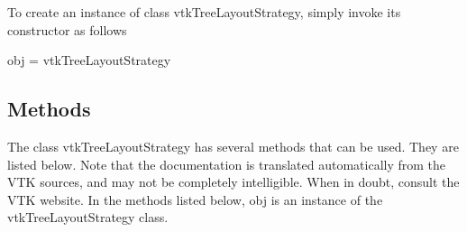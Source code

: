 To create an instance of class vtk\-Tree\-Layout\-Strategy, simply invoke its constructor as follows \begin{DoxyVerb}  obj = vtkTreeLayoutStrategy
\end{DoxyVerb}
 \hypertarget{vtkwidgets_vtkxyplotwidget_Methods}{}\subsection{Methods}\label{vtkwidgets_vtkxyplotwidget_Methods}
The class vtk\-Tree\-Layout\-Strategy has several methods that can be used. They are listed below. Note that the documentation is translated automatically from the V\-T\-K sources, and may not be completely intelligible. When in doubt, consult the V\-T\-K website. In the methods listed below, {\ttfamily obj} is an instance of the vtk\-Tree\-Layout\-Strategy class. 
